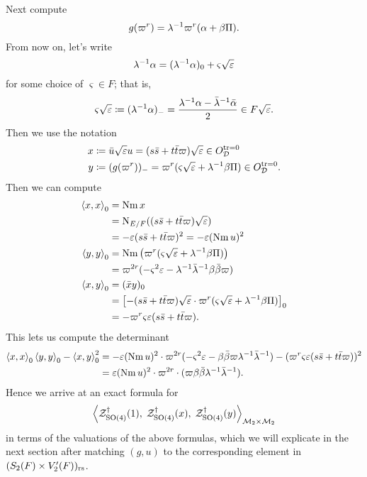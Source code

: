 Next compute
\[ g(\varpi^r) = \lambda^{-1} \varpi^r(\alpha + \beta \Pi). \]
From now on, let's write
\[ \lambda^{-1}\alpha = (\lambda^{-1}\alpha)_0 + \varsigma \sqrt{\varepsilon} \]
for some choice of $\varsigma \in F$; that is,
\[ \varsigma\sqrt{\varepsilon} \coloneqq (\lambda^{-1} \alpha)_-
  = \frac{\lambda^{-1} \alpha - \bar\lambda^{-1} \bar\alpha}{2}
  \in F \sqrt{\varepsilon}. \]
Then we use the notation
\begin{align*}
  x &\coloneqq \bar u \sqrt{\varepsilon} u = (s \bar s + t \bar t \varpi) \sqrt{\varepsilon} \in O_\mathcal D^{\operatorname{tr} = 0} \\
  y &\coloneqq (g(\varpi^r))_- = \varpi^r(\varsigma\sqrt{\varepsilon} + \lambda^{-1} \beta \Pi) \in O_\mathcal D^{\operatorname{tr} = 0}.
\end{align*}
Then we can compute
\begin{align*}
  \left\langle x,x \right\rangle _0
  &= \operatorname{Nm} x \\
  &= \operatorname{N}_{E/F}((s \bar s + t \bar t \varpi)\sqrt{\varepsilon}) \\
  &= -\varepsilon(s \bar s + t \bar t \varpi)^2 = -\varepsilon (\operatorname{Nm} u)^2 \\
  \left\langle y,y \right\rangle _0
  &= \operatorname{Nm} \left( \varpi^r(\varsigma\sqrt{\varepsilon} + \lambda^{-1} \beta \Pi) \right)  \\
  &= \varpi^{2r} (-\varsigma^2\varepsilon -  \lambda^{-1}\bar\lambda^{-1} \beta\bar\beta \varpi) \\
  \left\langle x,y \right\rangle _0 &= (\bar x y)_0 \\
  &= \left[
    -(s \bar s + t \bar t \varpi) \sqrt{\varepsilon}
    \cdot
    \varpi^{r} (\varsigma\sqrt{\varepsilon} + \lambda^{-1} \beta \Pi)
  \right]_0 \\
  &= - \varpi^r \varsigma \varepsilon (s \bar s + t \bar t \varpi).
\end{align*}
This lets us compute the determinant
\begin{align*}
  \left\langle x,x \right\rangle _0 \left\langle y,y \right\rangle _0 - \left\langle x,y \right\rangle^2_0
  &= - \varepsilon (\operatorname{Nm} u)^2\cdot \varpi^{2r}
    (-\varsigma^2 \varepsilon - \beta \bar\beta \varpi \lambda^{-1}\bar\lambda^{-1})
  - (\varpi^r \varsigma \varepsilon (s \bar s + t \bar t \varpi))^2 \\
  &= \varepsilon (\operatorname{Nm} u)^2\cdot \varpi^{2r} \cdot
    (\varpi \beta \bar\beta \lambda^{-1} \bar \lambda^{-1}).
\end{align*}
Hence we arrive at an exact formula for
\[ \left< \mathcal Z^{\dagger}_{\operatorname{SO}(4)}(1), \; \mathcal Z^{\dagger}_{\operatorname{SO}(4)}(x), \; \mathcal Z^{\dagger}_{\operatorname{SO}(4)}(y) \right>_{\mathcal M_2 \times \mathcal M_2} \]
in terms of the valuations of the above formulas,
which we will explicate in the next section after matching $(g,u)$
to the corresponding element in $(S_2(F) \times V_2'(F))_{\mathrm{rs}}$.
